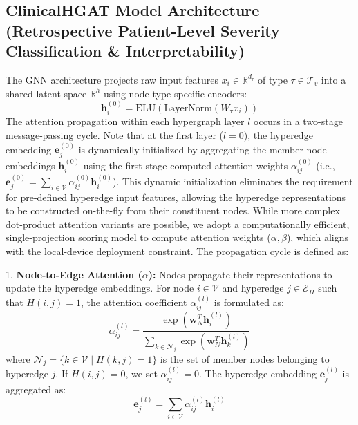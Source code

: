 \documentclass[conference]{IEEEtran}
\begin{document}
\subsection{ClinicalHGAT Model Architecture (Retrospective Patient-Level Severity Classification \& Interpretability)}
The GNN architecture projects raw input features $x_i \in \mathbb{R}^{d_{\tau}}$ of type $\tau \in \mathcal{T}_v$ into a shared latent space $\mathbb{R}^h$ using node-type-specific encoders:
\begin{equation}
    \mathbf{h}_i^{(0)} = \text{ELU}(\text{LayerNorm}(W_{\tau} x_i))
\end{equation}
The attention propagation within each hypergraph layer $l$ occurs in a two-stage message-passing cycle. Note that at the first layer ($l=0$), the hyperedge embedding $\mathbf{e}_j^{(0)}$ is dynamically initialized by aggregating the member node embeddings $\mathbf{h}_i^{(0)}$ using the first stage computed attention weights $\alpha_{ij}^{(0)}$ (i.e., $\mathbf{e}_j^{(0)} = \sum_{i \in \mathcal{V}} \alpha_{ij}^{(0)} \mathbf{h}_i^{(0)}$). This dynamic initialization eliminates the requirement for pre-defined hyperedge input features, allowing the hyperedge representations to be constructed on-the-fly from their constituent nodes. While more complex dot-product attention variants are possible, we adopt a computationally efficient, single-projection scoring model to compute attention weights ($\alpha, \beta$), which aligns with the local-device deployment constraint. The propagation cycle is defined as:

1. \textbf{Node-to-Edge Attention ($\alpha$):} Nodes propagate their representations to update the hyperedge embeddings. For node $i \in \mathcal{V}$ and hyperedge $j \in \mathcal{E}_H$ such that $H(i,j)=1$, the attention coefficient $\alpha_{ij}^{(l)}$ is formulated as:
\begin{equation}
    \alpha_{ij}^{(l)} = \frac{\exp(\mathbf{w}_N^T \mathbf{h}_i^{(l)})}{\sum_{k \in \mathcal{N}_j} \exp(\mathbf{w}_N^T \mathbf{h}_k^{(l)})}
\end{equation}
where $\mathcal{N}_j = \{k \in \mathcal{V} \mid H(k,j) = 1\}$ is the set of member nodes belonging to hyperedge $j$. If $H(i,j)=0$, we set $\alpha_{ij}^{(l)} = 0$. The hyperedge embedding $\mathbf{e}_j^{(l)}$ is aggregated as:
\begin{equation}
    \mathbf{e}_j^{(l)} = \sum_{i \in \mathcal{V}} \alpha_{ij}^{(l)} \mathbf{h}_i^{(l)}
\end{equation}
\end{document}
